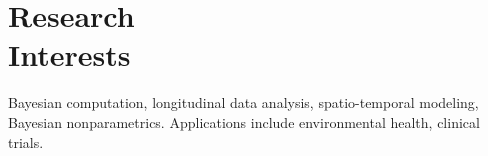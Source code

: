 \section{Research \\ Interests}

Bayesian computation, longitudinal data analysis, spatio-temporal modeling, Bayesian nonparametrics. 
Applications include environmental health, clinical trials. 